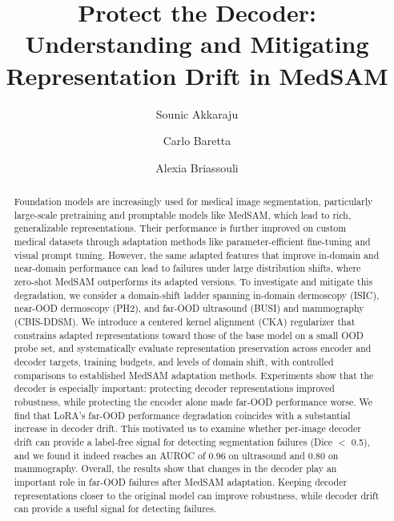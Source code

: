 \documentclass[runningheads]{llncs}
\begin{document}
\title{Protect the Decoder: Understanding and Mitigating Representation Drift in MedSAM}
\author{Sounic Akkaraju \and
Carlo Baretta \and
Alexia Briassouli}

\maketitle

\begin{abstract}
Foundation models are increasingly used for medical image segmentation, particularly large-scale pretraining and promptable models like MedSAM, which lead to rich, generalizable representations. Their performance is further improved on custom medical datasets through adaptation methods like parameter-efficient fine-tuning and visual prompt tuning. However, the same adapted features that improve in-domain and near-domain performance can lead to failures under large distribution shifts, where zero-shot MedSAM outperforms its adapted versions. To investigate and mitigate this degradation, we consider a domain-shift ladder spanning in-domain dermoscopy (ISIC), near-OOD dermoscopy (PH2), and far-OOD ultrasound (BUSI) and mammography (CBIS-DDSM). We introduce a centered kernel alignment (CKA) regularizer that constrains adapted representations toward those of the base model on a small OOD probe set, and systematically evaluate representation preservation across encoder and decoder targets, training budgets, and levels of domain shift, with controlled comparisons to established MedSAM adaptation methods. Experiments show that the decoder is especially important: protecting decoder representations improved robustness, while protecting the encoder alone made far-OOD performance worse. We find that LoRA's far-OOD performance degradation coincides with a substantial increase in decoder drift. This motivated us to examine whether per-image decoder drift can provide a label-free signal for detecting segmentation failures (Dice $<$ 0.5), and we found it indeed reaches an AUROC of 0.96 on ultrasound and 0.80 on mammography. Overall, the results show that changes in the decoder play an important role in far-OOD failures after MedSAM adaptation. Keeping decoder representations closer to the original model can improve robustness, while decoder drift can provide a useful signal for detecting failures.
\end{abstract}
\end{document}
